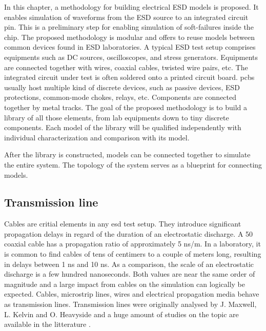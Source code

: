 In this chapter, a methodology for building electrical ESD models is proposed.
It enables simulation of waveforms from the ESD source to an integrated circuit pin.
This is a preliminary step for enabling simulation of soft-failures inside the chip.
The proposed methodology is modular and offers to reuse models between common devices found in ESD laboratories.
A typical ESD test setup comprises equipments such as DC sources, oscilloscopes, and stress generators.
Equipments are connected together with wires, coaxial cables, twisted wire pairs, etc.
The integrated circuit under test is often soldered onto a printed circuit board.
\gls{pcb}s usually host multiple kind of discrete devices, such as passive devices, ESD protections, common-mode chokes, relays, etc.
Components are connected together by metal tracks.
The goal of the proposed methodology is to build a library of all those elements, from lab equipments down to tiny discrete components.
Each model of the library will be qualified independently with individual characterization and comparison with its model.

After the library is constructed, models can be connected together to simulate the entire system.
The topology of the system serves as a blueprint for connecting models.

\subsection{Transmission line}

Cables are critial elements in any \gls{esd} test setup.
They introduce significant propagation delays in regard of the duration of an electrostatic discharge.
A 50\textOmega{} coaxial cable has a propagation ratio of approximately 5 ns/m.
In a laboratory, it is common to find cables of tens of centimers to a couple of meters long, resulting in delays between 1 ns and 10 ns.
As a comparison, the scale of an electrostatic discharge is a few hundred nanoseconds.
Both values are near the same order of magnitude and a large impact from cables on the simulation can logically be expected.
Cables, microstrip lines, wires and electrical propagation media behave as transmission lines.
Transmission lines were originally analysed by J. Maxwell, L. Kelvin and O. Heavyside and a huge amount of studies on the topic are available in the litterature \cite{branin-tl-ref, hf-coax,lossy-tl,emc-analysis-tl}.


